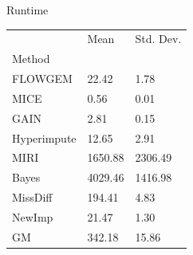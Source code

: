 \documentclass{article}
\begin{document}
Runtime

\bigskip

\begin{tabular}{lll}
\toprule
 & Mean & Std. Dev. \\
Method &  &  \\
\midrule
FLOWGEM & 22.42 & 1.78 \\
MICE & 0.56 & 0.01 \\
GAIN & 2.81 & 0.15 \\
Hyperimpute & 12.65 & 2.91 \\
MIRI & 1650.88 & 2306.49 \\
Bayes & 4029.46 & 1416.98 \\
MissDiff & 194.41 & 4.83 \\
NewImp & 21.47 & 1.30 \\
GM & 342.18 & 15.86 \\
\bottomrule
\end{tabular}
\end{document}

